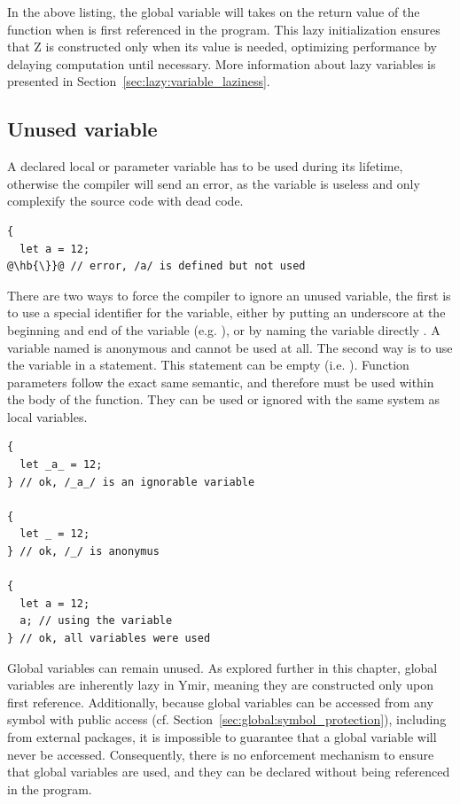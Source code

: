 In the above listing, the global variable  will takes on the return
value of the function  when  is first referenced in the
program. This lazy initialization ensures that Z is constructed only when its
value is needed, optimizing performance by delaying computation until necessary.
More information about lazy variables is presented in
Section~\ref{sec:lazy:variable_laziness}.

\subsection{Unused variable}
\label{sec:memory:unused_variables}

A declared local or parameter variable has to be used during its lifetime,
otherwise the compiler will send an error, as the variable is useless and only
complexify the source code with dead code.

\begin{lstlisting}[style=coloredverbatimError, escapechar=@]
{
  let a = 12;
@\hb{\}}@ // error, /a/ is defined but not used
\end{lstlisting}

There are two ways to force the compiler to ignore an unused variable, the first
is to use a special identifier for the variable, either by putting an underscore
at the beginning and end of the variable (e.g. ), or by naming the
variable directly \token{\_}. A variable named \token{\_} is anonymous and
cannot be used at all. The second way is to use the variable in a statement.
This statement can be empty (i.e. ). Function parameters follow the
exact same semantic, and therefore must be used within the body of the function.
They can be used or ignored with the same system as local variables.

\begin{lstlisting}[style=coloredverbatim, escapechar=@]
{
  let _a_ = 12;
} // ok, /_a_/ is an ignorable variable

{
  let _ = 12;
} // ok, /_/ is anonymus

{
  let a = 12;
  a; // using the variable
} // ok, all variables were used
\end{lstlisting}

Global variables can remain unused. As explored further in this chapter, global
variables are inherently lazy in Ymir, meaning they are constructed only upon
first reference. Additionally, because global variables can be accessed from any
symbol with public access (cf. Section~\ref{sec:global:symbol_protection}), including
from external packages, it is impossible to guarantee that a global variable
will never be accessed. Consequently, there is no enforcement mechanism to
ensure that global variables are used, and they can be declared without being
referenced in the program.

